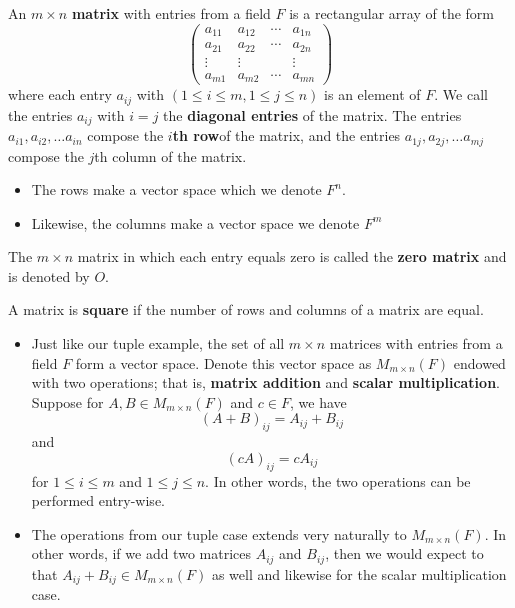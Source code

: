 \begin{definition}
An \( m \times n  \) \textbf{matrix} with entries from a field \( F  \) is a rectangular array of the form
    \[  \begin{pmatrix}
        a_{11} & a_{12} & \cdots & a_{1n} \\
        a_{21} & a_{22} & \cdots & a_{2n}  \\
        \vdots & \vdots &           & \vdots \\
        a_{m1} & a_{m2} & \cdots     & a_{mn}
    \end{pmatrix} \]
    where each entry \( a_{ij} \) with \( (1 \leq i \leq m , 1 \leq j \leq n  ) \) is an element of \( F  \). We call the entries \( a_{ij}  \) with \( i = j  \) the \textbf{diagonal entries} of the matrix. The entries \( a_{i1}, a_{i2}, \dots a_{in} \) compose the \textbf{\( i \)th row}of the matrix, and the entries \( a_{1j}, a_{2j}, \dots a_{mj } \) compose the \( j \)th column of the matrix.
\end{definition}

\begin{itemize}
    \item The rows make a vector space which we denote \( F^{n} \).
    \item Likewise, the columns make a vector space we denote \( F^{m} \)
\end{itemize}

\begin{definition}   
    The \( m \times n  \) matrix in which each entry equals zero is called the \textbf{zero matrix} and is denoted by \( O \).
\end{definition}

\begin{definition}
    A matrix is \textbf{square} if the number of rows and columns of a matrix are equal.
\end{definition}

\begin{itemize}
    \item Just like our tuple example, the set of all \( m \times n  \) matrices with entries from a field \( F  \) form a vector space. Denote this vector space as \( M_{m \times n}(F) \) endowed with two operations; that is, \textbf{matrix addition} and \textbf{scalar multiplication}. Suppose for \( A,B \in M_{m \times n}(F) \) and \( c \in F  \), we have 
        \[   (A + B)_{ij} = A_{ij} + B_{ij} \]
        and 
        \[  (cA)_{ij} = c A_{ij} \] for \(  1 \leq i \leq m  \) and \( 1 \leq j \leq n  \). In other words, the two operations can be performed entry-wise.
    \item The operations from our tuple case extends very naturally to \( M_{m \times n}(F) \). In other words, if we add two matrices \( A_{ij}  \) and \( B_{ij }  \), then we would expect to that \( A_{ij} + B_{ij} \in  M_{m \times n }(F) \) as well and likewise for the scalar multiplication case.
\end{itemize}

